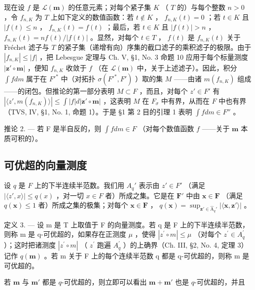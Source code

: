 现在设 \(f\) 是 \(\mathcal{L}(\mathbf{m})\) 的任意元素；对每个紧子集 \(K\) （ \(T\) 的）与每个整数 \(n > 0\) ，令 \(f_{n,K}\) 为 \(T\) 上如下定义的数值函数：若 \(t \notin K\) ， \(f_{n,K}(t) = 0\) ；若 \(t \in K\) 且 \(|f(t) \leqslant n\) ， \(f_{n,K}(t) = f(t)\) ；最后，若 \(t \in K\) 且 \(|f(t)| > n\) ， \(f_{n,K}(t) = nf(t)/|f(t)|\) 。显然，对每个 \(t \in T\) ， \(f(t)\) 是 \(f_{n,K}(t)\) 关于 Fréchet 滤子与 \(T\) 的紧子集（递增有向）序集的截口滤子的乘积滤子的极限。由于 \(|f_{n,K}| \leqslant |f|\) ，把 Lebesgue 定理与 Ch. V, §1, No. 3 命题 10 应用于每个标量测度 \(|\mathbf{z}' \circ \mathbf{m}|\) ，便知 \(f_{n,K}\) 收敛于 \(f\) （在 \(\mathcal{L}(\mathbf{m})\) 中，关于上述滤子）。因此，积分 \(\int f dm\) 属于在 \(F'^*\) 中（对拓扑 \(\sigma(F'^*, F')\) ）取的集 \(M\) ——由诸 \(m(f_{n,K})\) 组成——的闭包。但推论的第一部分表明 \(M \subset F\) ，而且，对每个 \(z' \in F'\) 有 \(|\langle z', m(f_{n,K})\rangle| \leqslant \int |f| d|\mathbf{z}' \circ \mathbf{m}|\) ，这表明 \(M\) 在 \(F_\sigma\) 中有界，从而在 \(F\) 中也有界（TVS, IV, §1, No. 1, 命题 1）。于是 §1 第 2 目的引理 1 表明 \(\int f dm \in F''\) 。

推论 2. --- 若 F 是半自反的，则 \(\int f dm \in F\) （对每个数值函数 \(f\) ——关于 \(\mathbf{m}\) 本质可积的）。

\subsection{可优超的向量测度}

设 \(q\) 是 \(F\) 上的下半连续半范数。我们用 \(A_q'\) 表示由 \(z' \in F'\) （满足 \(|\langle z', x \rangle| \leqslant q(x)\) ，对一切 \(x \in F\) 者）所成之集。它是在 \(\mathbf{F}'\) 中由 \(\mathbf{x} \in \mathbf{F}\) （满足 \(q(\mathbf{x}) \leqslant 1\) 者）所成之集的极集；对每个 \(\mathbf{x} \in \mathbf{F}\) ， \(q(\mathbf{x}) = \sup_{\mathbf{z}' \in \hat{\mathrm{A}}_q'} |\langle \mathbf{x}, \mathbf{z}' \rangle|\) 。

定义 3. --- 设 m 是 T 上取值于 F 的向量测度。若 q 是 F 上的下半连续半范数，则称 m 是 q-可优超的，如果存在正测度 \(\mu\) ，使得 \(|z^{\prime} \circ m| \leqslant \mu\) （对每个 \(z^{\prime} \in A_{q}^{\prime}\) ）；这时把诸测度 \(|z^{\prime} \circ m|\) （ \(z^{\prime}\) 跑遍 \(A_{q}^{\prime}\) ）的上确界（Ch. III, §2, No. 4, 定理 3）记作 \(q(\mathbf{m})\) 。若 m 关于 F 上的每个连续半范数 q 都是 q-可优超的，则称 m 是可优超的。

若 \(\mathbf{m}\) 与 \(\mathbf{m}'\) 都是 \(q\)-可优超的，则立即可以看出 \(\mathbf{m} + \mathbf{m}'\) 也是 \(q\)-可优超的，并且

